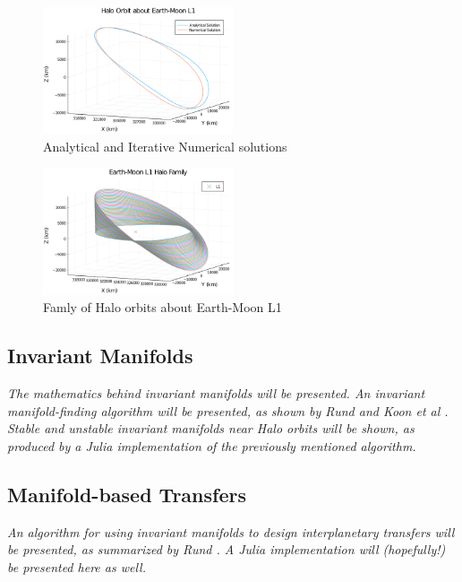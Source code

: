 \documentclass[conf]{new-aiaa}
\begin{document}
\begin{multicols*}{2}
\begin{figure}[H]
    \hskip -0.3cm
    \includegraphics[width=0.5\textwidth]{analytical_numerical_halo.png}
    \caption{Analytical and Iterative Numerical solutions}
\end{figure}

\begin{figure}[H]
    \hskip -0.3cm
    \includegraphics[width=0.5\textwidth]{halo_family_example.png}
    \caption{Famly of Halo orbits about Earth-Moon L1}
\end{figure}

\subsection{Invariant Manifolds}

\textit{
    The mathematics behind invariant manifolds will be 
    presented. An invariant manifold-finding algorithm 
    will be presented, as shown by Rund and Koon et al 
    \cite{rund2018interplanetary}
    \cite{koon2008dynamical}.
    Stable and unstable invariant manifolds near Halo 
    orbits will be shown, as produced by a Julia 
    implementation of the previously mentioned 
    algorithm.
}

\subsection{Manifold-based Transfers}

\textit{
    An algorithm for using invariant manifolds to 
    design interplanetary transfers will be presented,
    as summarized by Rund \cite{rund2018interplanetary}.
    A Julia implementation will (hopefully!) be presented
    here as well.
}


\end{multicols*}
\end{document}
